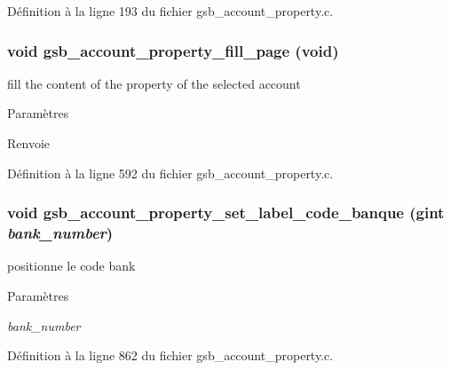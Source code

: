 Définition à la ligne 193 du fichier gsb\_\-account\_\-property.c.

\subsubsection[{gsb\_\-account\_\-property\_\-fill\_\-page}]{\setlength{\rightskip}{0pt plus 5cm}void gsb\_\-account\_\-property\_\-fill\_\-page (void)}\label{gsb__account__property_8h_ad38d51ca992f37d0392bd134617031ed}
fill the content of the property of the selected account


\begin{DoxyParams}{Paramètres}
\item[{\em }]\end{DoxyParams}
\begin{DoxyReturn}{Renvoie}

\end{DoxyReturn}


Définition à la ligne 592 du fichier gsb\_\-account\_\-property.c.

\subsubsection[{gsb\_\-account\_\-property\_\-set\_\-label\_\-code\_\-banque}]{\setlength{\rightskip}{0pt plus 5cm}void gsb\_\-account\_\-property\_\-set\_\-label\_\-code\_\-banque (gint {\em bank\_\-number})}\label{gsb__account__property_8h_a75cc1b849ec26a65239a9864b21ef062}
positionne le code bank


\begin{DoxyParams}{Paramètres}
\item[{\em bank\_\-number}]\end{DoxyParams}


Définition à la ligne 862 du fichier gsb\_\-account\_\-property.c.


